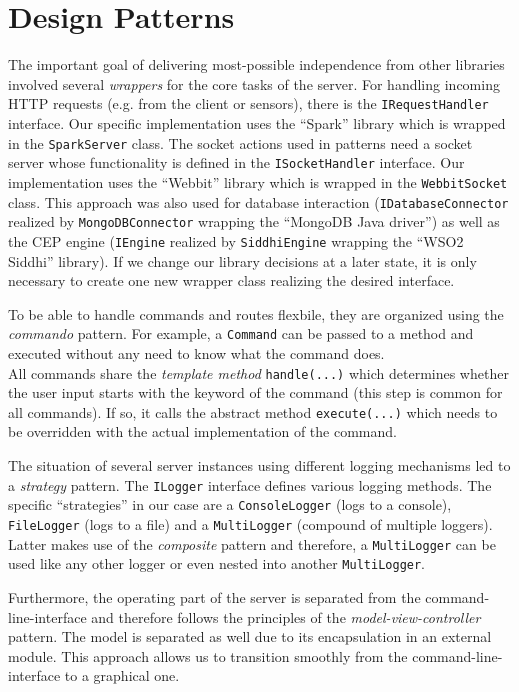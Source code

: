 \section{Design Patterns}
The important goal of delivering most-possible independence from other libraries
involved several \emph{wrappers} for the core tasks of the server.
For handling incoming HTTP requests (e.g. from the client or sensors), there is
the \texttt{IRequestHandler} interface. Our specific implementation uses
the \enquote{Spark} library which is wrapped in the \texttt{SparkServer} class.
The socket actions used in patterns need a socket server whose functionality is
defined in the \texttt{ISocketHandler} interface. Our implementation uses the
\enquote{Webbit} library which is wrapped in the \texttt{WebbitSocket} class.
This approach was also used for database interaction (\texttt{IDatabaseConnector}
realized by \texttt{MongoDBConnector} wrapping the \enquote{MongoDB Java driver}) as well as
the CEP engine (\texttt{IEngine} realized by \texttt{SiddhiEngine} wrapping the
\enquote{WSO2 Siddhi} library). If we change our library decisions at a later state,
it is only necessary to create one new wrapper class realizing the desired interface.

To be able to handle commands and routes flexbile, they are organized using
the \emph{commando} pattern. For example, a \texttt{Command} can be passed to a
method and executed without any need to know what the command does. \\
All commands share the \emph{template method} \texttt{handle(...)} which
determines whether the user input starts with the keyword of the command
(this step is common for all commands). If so, it calls the abstract method
\texttt{execute(...)} which needs to be overridden with the actual implementation
of the command.

The situation of several server instances using different logging mechanisms
led to a \emph{strategy} pattern. The \texttt{ILogger} interface defines
various logging methods. The specific \enquote{strategies} in our case are a
\texttt{ConsoleLogger} (logs to a console), \texttt{FileLogger} (logs to a file)
and a \texttt{MultiLogger} (compound of multiple loggers). Latter makes use
of the \emph{composite} pattern and therefore, a \texttt{MultiLogger} can be used
like any other logger or even nested into another \texttt{MultiLogger}.

Furthermore, the operating part of the server is separated from the command-line-interface
and therefore follows the principles of the \emph{model-view-controller} pattern.
The model is separated as well due to its encapsulation in an external module.
This approach allows us to transition smoothly from the command-line-interface
to a graphical one.


